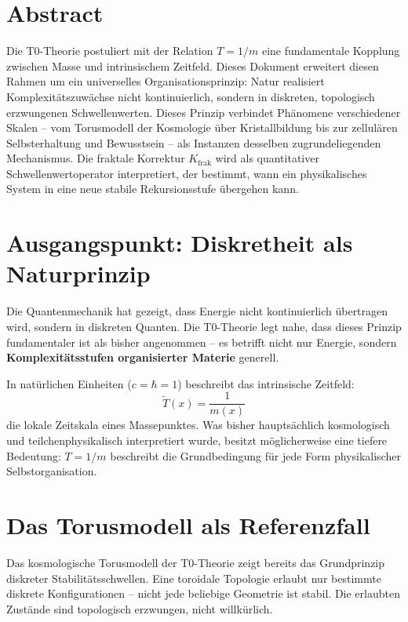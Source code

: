 
\section*{Abstract}	

		Die T0-Theorie postuliert mit der Relation $T = 1/m$ eine fundamentale Kopplung zwischen Masse und intrinsischem Zeitfeld. Dieses Dokument erweitert diesen Rahmen um ein universelles Organisationsprinzip: Natur realisiert Komplexitätszuwächse nicht kontinuierlich, sondern in diskreten, topologisch erzwungenen Schwellenwerten. Dieses Prinzip verbindet Phänomene verschiedener Skalen -- vom Torusmodell der Kosmologie über Kristallbildung bis zur zellulären Selbsterhaltung und Bewusstsein -- als Instanzen desselben zugrundeliegenden Mechanismus. Die fraktale Korrektur $K_{\text{frak}}$ wird als quantitativer Schwellenwertoperator interpretiert, der bestimmt, wann ein physikalisches System in eine neue stabile Rekursionsstufe übergehen kann.

	
	\section{Ausgangspunkt: Diskretheit als Naturprinzip}
	
	Die Quantenmechanik hat gezeigt, dass Energie nicht kontinuierlich übertragen wird, sondern in diskreten Quanten. Die T0-Theorie legt nahe, dass dieses Prinzip fundamentaler ist als bisher angenommen -- es betrifft nicht nur Energie, sondern \textbf{Komplexitätsstufen organisierter Materie} generell.
	
	In natürlichen Einheiten ($c = \hbar = 1$) beschreibt das intrinsische Zeitfeld:
	\begin{equation}
		\tilde{T}(x) = \frac{1}{m(x)}
	\end{equation}
	die lokale Zeitskala eines Massepunktes. Was bisher hauptsächlich kosmologisch und teilchenphysikalisch interpretiert wurde, besitzt möglicherweise eine tiefere Bedeutung: $T = 1/m$ beschreibt die Grundbedingung für jede Form physikalischer Selbstorganisation.
	
	\section{Das Torusmodell als Referenzfall}
	
	Das kosmologische Torusmodell der T0-Theorie zeigt bereits das Grundprinzip diskreter Stabilitätsschwellen. Eine toroidale Topologie erlaubt nur bestimmte diskrete Konfigurationen -- nicht jede beliebige Geometrie ist stabil. Die erlaubten Zustände sind topologisch erzwungen, nicht willkürlich.
	

